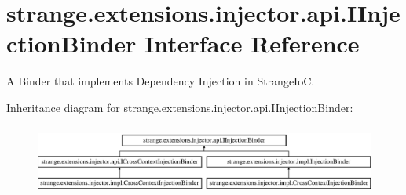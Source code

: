 \hypertarget{interfacestrange_1_1extensions_1_1injector_1_1api_1_1_i_injection_binder}{\section{strange.\-extensions.\-injector.\-api.\-I\-Injection\-Binder Interface Reference}
\label{interfacestrange_1_1extensions_1_1injector_1_1api_1_1_i_injection_binder}
}


A Binder that implements Dependency Injection in Strange\-Io\-C.  


Inheritance diagram for strange.\-extensions.\-injector.\-api.\-I\-Injection\-Binder\-:\begin{figure}[H]
\begin{center}
\leavevmode
\includegraphics[height=2.333333cm]{interfacestrange_1_1extensions_1_1injector_1_1api_1_1_i_injection_binder}
\end{center}
\end{figure}
